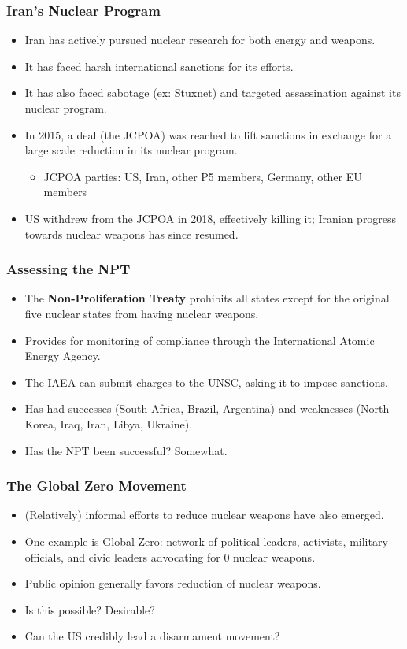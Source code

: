 \documentclass{beamer}
\begin{document}
\begin{frame} 
\frametitle{\LARGE{Iran's Nuclear Program}}
\begin{itemize}
		\item Iran has actively pursued nuclear research for both energy and weapons. \pause
		\item It has faced harsh international sanctions for its efforts. \pause
		\item It has also faced sabotage (ex: Stuxnet) and targeted assassination against its nuclear program. 
		\item In 2015, a deal (the JCPOA) was reached to lift sanctions in exchange for a large scale reduction in its nuclear program. \pause
		\begin{itemize}
			\item JCPOA parties: US, Iran, other P5 members, Germany, other EU members \pause
		\end{itemize}
		\item US withdrew from the JCPOA in 2018, effectively killing it; Iranian progress towards nuclear weapons has since resumed.
\end{itemize}
\end{frame}

\begin{frame} 
\frametitle{\LARGE{Assessing the NPT}}
\begin{itemize}
		\item The \textbf{Non-Proliferation Treaty} prohibits all states except for the original five nuclear states from having nuclear weapons. \pause
		\item Provides for monitoring of compliance through the International Atomic Energy Agency. \pause 
		\item The IAEA can submit charges to the UNSC, asking it to impose sanctions. \pause
		\item Has had successes (South Africa, Brazil, Argentina) and weaknesses (North Korea, Iraq, Iran, Libya, Ukraine). \pause
		\item Has the NPT been successful? Somewhat.
\end{itemize}
\end{frame}



\begin{frame} 
\frametitle{\LARGE{The Global Zero Movement}}
\begin{itemize}
		\item (Relatively) informal efforts to reduce nuclear weapons have also emerged. \pause \item One example is \href{https://www.globalzero.org/}{Global Zero}: network of political leaders, activists, military officials, and civic leaders advocating for 0 nuclear weapons. \pause
		\item Public opinion generally favors reduction of nuclear weapons. \pause 
		\item Is this possible? Desirable? \pause 
		\item Can the US credibly lead a disarmament movement? 
\end{itemize}
\end{frame}
\end{document}

